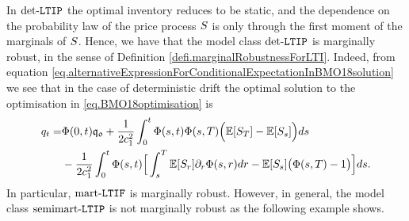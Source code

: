 \documentclass[10pt,a4paper]{article}
\begin{document}
	In $\text{det-}\mathtt{LTIP}$ the optimal inventory reduces to be static, and the dependence on the probability law of the price process $S$ is only through the first moment of the marginals of $S$.  Hence, we have that the model class $\text{det-}\mathtt{LTIP}$ is marginally robust, in the sense of Definition \ref{defi.marginalRobustnessForLTI}. Indeed, from equation \eqref{eq.alternativeExpressionForConditionalExpectationInBMO18solution} we see that in the case of deterministic drift the optimal solution to the optimisation in \eqref{eq.BMO18optimisation} is 
	\begin{equation*}
	\begin{split}
	q_t 
	= &
	\Phi(0,t)\mathfrak{q_0} 
	+\frac{1}{2c_{1}^{2}}
			 \int_{0}^{t}  \Phi(s,t)\Phi(s,T)\Big(\mathbb{{E}}[S_T]- \mathbb{{E}} [S_s]\Big) ds \\
	&- \frac{1}{2c_{1}^{2}}
			 \int_{0}^{t}\Phi(s,t)\Big[
			 		\int_{s}^{T} \mathbb{{E}}[S_r]\partial_r \Phi (s,r)dr - \mathbb{{E}}[S_s] \big(\Phi(s,T)-1\big)
					\Big]ds.
	\end{split}
	\end{equation*}
	In particular,  $\text{mart-}\mathtt{LTIF}$ is marginally robust. However, in general, the model class $\text{semimart-}\mathtt{LTIP}$ is not marginally robust as the following example shows. 
	
\end{document}
